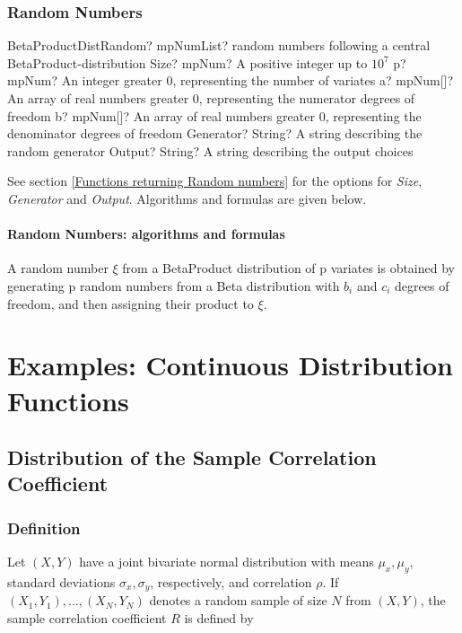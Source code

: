 \subsection{Random Numbers}

\begin{mpFunctionsExtract}
	\mpFunctionSixNotImplemented
	{BetaProductDistRandom? mpNumList? random numbers following a central BetaProduct-distribution}
	{Size? mpNum? A positive integer up to $10^7$}
	{p? mpNum? An integer greater 0, representing the number of variates}
	{a? mpNum[]? An array of real numbers greater 0, representing the numerator  degrees of freedom}
	{b? mpNum[]? An array of real numbers greater 0, representing the denominator degrees of freedom}
	{Generator? String? A string describing the random generator}
	{Output? String? A string describing the output choices}
\end{mpFunctionsExtract}

\vspace{0.3cm}

See section \ref{Functions returning Random numbers} for the options for  {\itshape\sffamily Size},  {\itshape\sffamily Generator} and {\itshape\sffamily Output}. Algorithms and formulas are given below.


\subsubsection{Random Numbers: algorithms and formulas}
A random number $\xi$ from a BetaProduct distribution of p variates is  obtained by generating p random numbers from a Beta distribution with $b_i$ and $c_i$ degrees of freedom, and then assigning their product to $\xi$.






\chapter{Examples: Continuous Distribution Functions}



\section{Distribution of the Sample Correlation Coefficient}
\label{rhoDistribution}

\subsection{Definition}
Let $(X, Y)$ have a joint bivariate normal distribution with means $\mu_x, \mu_y$, standard deviations $\sigma_x, \sigma_y$, respectively, and correlation $\rho$. If $(X_1, Y_1), ..., (X_N, Y_N)$ denotes a random sample of size $N$ from $(X, Y)$, the sample correlation coefficient $R$ is defined by

